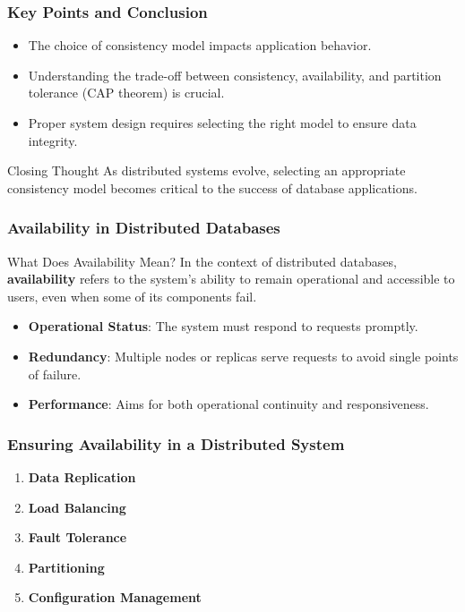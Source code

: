 \documentclass[aspectratio=169]{beamer}
\begin{document}
\begin{frame}[fragile]
    \frametitle{Key Points and Conclusion}
    \begin{itemize}
        \item The choice of consistency model impacts application behavior.
        \item Understanding the trade-off between consistency, availability, and partition tolerance (CAP theorem) is crucial.
        \item Proper system design requires selecting the right model to ensure data integrity.
    \end{itemize}
    \begin{block}{Closing Thought}
        As distributed systems evolve, selecting an appropriate consistency model becomes critical to the success of database applications.
    \end{block}
\end{frame}

\begin{frame}[fragile]
    \frametitle{Availability in Distributed Databases}
    \begin{block}{What Does Availability Mean?}
        In the context of distributed databases, \textbf{availability} refers to the system's ability to remain operational and accessible to users, even when some of its components fail. 
    \end{block}
    \begin{itemize}
        \item \textbf{Operational Status}: The system must respond to requests promptly.
        \item \textbf{Redundancy}: Multiple nodes or replicas serve requests to avoid single points of failure.
        \item \textbf{Performance}: Aims for both operational continuity and responsiveness.
    \end{itemize}
\end{frame}

\begin{frame}[fragile]
    \frametitle{Ensuring Availability in a Distributed System}
    \begin{enumerate}
        \item \textbf{Data Replication}
        \item \textbf{Load Balancing}
        \item \textbf{Fault Tolerance}
        \item \textbf{Partitioning}
        \item \textbf{Configuration Management}
    \end{enumerate}
\end{frame}
\end{document}
